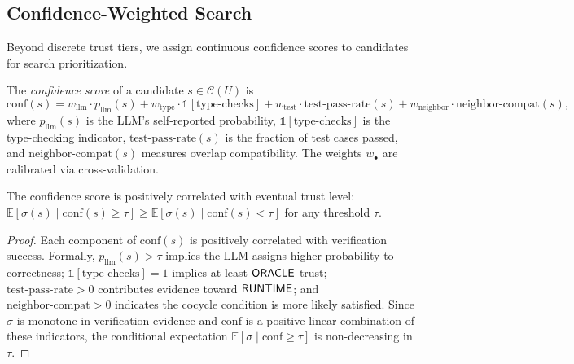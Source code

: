 \documentclass[11pt]{article}
\newcommand{\CandSpace}{\mathcal{C}}
\newcommand{\ProofScore}{\sigma}
\newcommand{\ConfThresh}{\tau}
\begin{document}
\subsection{Confidence-Weighted Search}\label{subsec:confidence}

Beyond discrete trust tiers, we assign continuous confidence scores
to candidates for search prioritization.

\begin{definition}\label{def:confidence}
The \emph{confidence score} of a candidate $s \in \CandSpace(U)$ is
\[
  \mathrm{conf}(s) = w_{\mathrm{llm}} \cdot p_{\mathrm{llm}}(s)
  + w_{\mathrm{type}} \cdot \mathbb{1}[\text{type-checks}]
  + w_{\mathrm{test}} \cdot \text{test-pass-rate}(s)
  + w_{\mathrm{neighbor}} \cdot \text{neighbor-compat}(s),
\]
where $p_{\mathrm{llm}}(s)$ is the LLM's self-reported probability,
$\mathbb{1}[\text{type-checks}]$ is the type-checking indicator,
$\text{test-pass-rate}(s)$ is the fraction of test cases passed, and
$\text{neighbor-compat}(s)$ measures overlap compatibility.
The weights $w_\bullet$ are calibrated via cross-validation.
\end{definition}

\begin{proposition}\label{prop:conf-trust}
The confidence score is positively correlated with eventual trust
level: $\mathbb{E}[\ProofScore(s) \mid \mathrm{conf}(s) \geq \ConfThresh]
\geq \mathbb{E}[\ProofScore(s) \mid \mathrm{conf}(s) < \ConfThresh]$
for any threshold $\ConfThresh$.
\end{proposition}

\begin{proof}
Each component of $\mathrm{conf}(s)$ is positively correlated with
verification success.  Formally, $p_{\mathrm{llm}}(s) > \ConfThresh$
implies the LLM assigns higher probability to correctness;
$\mathbb{1}[\text{type-checks}] = 1$ implies at least $\mathsf{ORACLE}$
trust; $\text{test-pass-rate} > 0$ contributes evidence toward
$\mathsf{RUNTIME}$; and $\text{neighbor-compat} > 0$ indicates the cocycle
condition is more likely satisfied.  Since $\ProofScore$ is monotone
in verification evidence and $\mathrm{conf}$ is a positive linear
combination of these indicators, the conditional expectation
$\mathbb{E}[\ProofScore \mid \mathrm{conf} \geq \ConfThresh]$ is
non-decreasing in $\ConfThresh$.
\end{proof}
\end{document}
